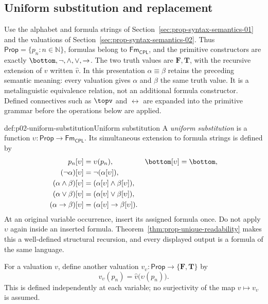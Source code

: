 \subsection{Uniform substitution and replacement}
\label{sec:p02-propositional-substitution}

Use the alphabet and formula strings of
Section~\ref{sec:prop-syntax-semantics-01} and the valuations of
Section~\ref{sec:prop-syntax-semantics-02}.  Thus
\(\mathsf{Prop}=\{p_n:n\in\mathbb N\}\), formulas belong to
\(\mathsf{Fm}_{\mathsf{CPL}}\), and the primitive constructors are exactly
\(\bottom,\neg,\land,\lor,\to\).  The two truth values are
\(\mathbf F,\mathbf T\), with the recursive extension of \(v\) written
\(\widehat v\).  In this presentation
\(\alpha\equiv\beta\) retains the preceding semantic meaning: every valuation
gives \(\alpha\) and \(\beta\) the same truth value.  It is a metalinguistic
equivalence relation, not an additional formula constructor.  Defined
connectives such as \(\topv\) and \(\leftrightarrow\) are expanded into the
primitive grammar before the operations below are applied.

\begin{hbdefinition}{def:p02-uniform-substitution}{Uniform substitution}
A \emph{uniform substitution} is a function
\(\upsilon:\mathsf{Prop}\to\mathsf{Fm}_{\mathsf{CPL}}\).  Its simultaneous
extension to formula strings is defined by
\[
\begin{aligned}
 p_n[\upsilon]&=\upsilon(p_n),&
 \bottom[\upsilon]&=\bottom,\\
 (\neg\alpha)[\upsilon]&=\neg(\alpha[\upsilon]),\\
 (\alpha\land\beta)[\upsilon]&=(\alpha[\upsilon]\land\beta[\upsilon]),\\
 (\alpha\lor\beta)[\upsilon]&=(\alpha[\upsilon]\lor\beta[\upsilon]),\\
 (\alpha\to\beta)[\upsilon]&=(\alpha[\upsilon]\to\beta[\upsilon]).
\end{aligned}
\]
At an original variable occurrence, insert its assigned formula once.
Do not apply \(\upsilon\) again inside an inserted formula.
Theorem~\ref{thm:prop-unique-readability} makes this a well-defined structural
recursion, and every displayed output is a formula of the same language.

For a valuation \(v\), define another valuation
\(v_\upsilon:\mathsf{Prop}\to\{\mathbf F,\mathbf T\}\) by
\[
 v_\upsilon(p_n)=\widehat v\bigl(\upsilon(p_n)\bigr).
\]
This is defined independently at each variable; no surjectivity of the map
\(v\mapsto v_\upsilon\) is assumed.
\end{hbdefinition}

